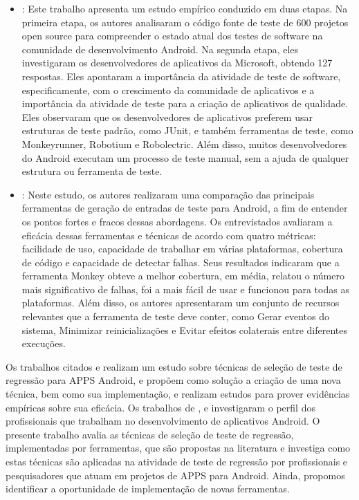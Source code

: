 \begin{itemize}
    \item \cite{7102609}: Este trabalho apresenta um estudo empírico conduzido em duas etapas. Na primeira etapa, os autores analisaram o código fonte de teste de 600 projetos open source para compreender o estado atual dos testes de software na comunidade de desenvolvimento Android. Na segunda etapa, eles investigaram os desenvolvedores de aplicativos da Microsoft, obtendo 127 respostas. Eles apontaram a importância da atividade de teste de software, especificamente, com o crescimento da comunidade de aplicativos e a importância da atividade de teste para a criação de aplicativos de qualidade. Eles observaram que os desenvolvedores de aplicativos preferem usar estruturas de teste padrão, como JUnit, e também ferramentas de teste, como Monkeyrunner, Robotium e Robolectric. Além disso, muitos desenvolvedores do Android executam um processo de teste manual, sem a ajuda de qualquer estrutura ou ferramenta de teste.
    
    
    \item \cite{ROY:2015}: Neste estudo, os autores realizaram uma comparação das principais ferramentas de geração de entradas de teste para Android, a fim de entender os pontos fortes e fracos dessas abordagens. Os entrevistados avaliaram a eficácia dessas ferramentas e técnicas de acordo com quatro métricas: facilidade de uso, capacidade de trabalhar em várias plataformas, cobertura de código e capacidade de detectar falhas. Seus resultados indicaram que a ferramenta Monkey obteve a melhor cobertura, em média, relatou o número mais significativo de falhas, foi a mais fácil de usar e funcionou para todas as plataformas. Além disso, os autores apresentaram um conjunto de recursos relevantes que a ferramenta de teste deve conter, como Gerar eventos do sistema, Minimizar reinicializações e Evitar efeitos colaterais entre diferentes execuções.
    
\end{itemize}
    
    Os trabalhos citados \cite{8377661} e \cite{Do2016RedroidAR} realizam um estudo sobre técnicas de seleção de teste de regressão para \ac{APPS} Android, e propõem como solução a criação de uma nova técnica, bem como sua implementação, e realizam estudos para prover evidências empíricas sobre sua eficácia. Os trabalhos de \cite{8094467}, \cite{7102609} e \cite{ROY:2015} investigaram o perfil dos profissionais que trabalham no desenvolvimento de aplicativos Android. O presente trabalho avalia as técnicas de seleção de teste de regressão, implementadas por ferramentas, que são propostas na literatura e investiga como estas técnicas são aplicadas na atividade de teste de regressão por profissionais e pesquisadores que atuam em projetos de \ac{APPS} para Android. Ainda, propomos identificar a oportunidade de implementação de novas ferramentas.


